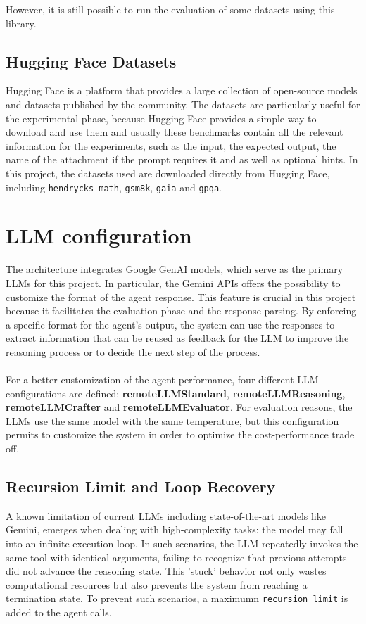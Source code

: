 \documentclass[12pt,a4paper,openright,twoside]{book}
\begin{document}
However, it is still possible to run the evaluation of some datasets using this library.
\subsection{Hugging Face Datasets}
Hugging Face is a platform that provides a large collection of open-source models and datasets published by the community. 
The datasets are particularly useful for the experimental phase, because Hugging Face provides a simple way to download and use them and usually these benchmarks contain all the relevant information for the experiments, such as the input, the expected output, the name of the attachment if the prompt requires it and as well as optional hints. 
In this project, the datasets used are downloaded directly from Hugging Face, 
including \texttt{hendrycks\_math},
\texttt{gsm8k}, \texttt{gaia} and \texttt{gpqa}.

\section{LLM configuration}
The architecture integrates Google GenAI models, which serve as the primary \acp{LLM} for this project. In particular, the Gemini \acp{API} offers the possibility to customize the format of the agent response.
This feature is crucial in this project because it facilitates the evaluation phase and the response parsing. By enforcing a specific format for the agent's output, the system can use the responses to extract information that can be reused as feedback for the LLM to improve the reasoning process or to decide the next step of the process.
\\\\
For a better customization of the agent performance, four different LLM configurations are defined: \textbf{remoteLLMStandard}, \textbf{remoteLLMReasoning}, \textbf{remoteLLMCrafter} and \textbf{remoteLLMEvaluator}.
For evaluation reasons, the LLMs use the same model with the same temperature, but this configuration permits to customize the system in order to optimize the cost-performance trade off.

\subsection{Recursion Limit and Loop Recovery}
A known limitation of current LLMs including state-of-the-art models like Gemini, emerges when dealing with high-complexity tasks: the model may fall into an infinite execution loop. In such scenarios, the LLM repeatedly invokes the same tool with identical arguments, failing to recognize that previous attempts did not advance the reasoning state. 
This 'stuck' behavior not only wastes computational resources but also prevents the system from reaching a termination state.
To prevent such scenarios, a maximumn \texttt{recursion\_limit} is added to the agent calls.  
\end{document}
